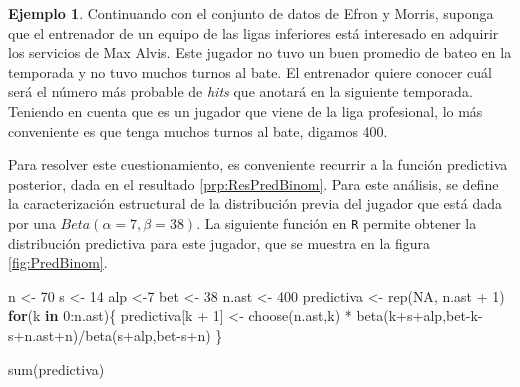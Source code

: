 \documentclass[
  spanish,
]{book}
\newenvironment{Shaded}{\begin{snugshade}}{\end{snugshade}}
\newcommand{\ConstantTok}[1]{\textcolor[rgb]{0.00,0.00,0.00}{#1}}
\newcommand{\ControlFlowTok}[1]{\textcolor[rgb]{0.13,0.29,0.53}{\textbf{#1}}}
\newcommand{\DecValTok}[1]{\textcolor[rgb]{0.00,0.00,0.81}{#1}}
\newcommand{\FunctionTok}[1]{\textcolor[rgb]{0.00,0.00,0.00}{#1}}
\newcommand{\NormalTok}[1]{#1}
\newcommand{\OtherTok}[1]{\textcolor[rgb]{0.56,0.35,0.01}{#1}}
\newcommand{\SpecialCharTok}[1]{\textcolor[rgb]{0.00,0.00,0.00}{#1}}
\theoremstyle{definition}
\theoremstyle{definition}
\newtheorem{example}{Ejemplo}[chapter]
\theoremstyle{definition}
\theoremstyle{definition}
\theoremstyle{remark}
\begin{document}
\begin{example}
\protect\hypertarget{exm:unnamed-chunk-29}{}{\label{exm:unnamed-chunk-29} }Continuando con el conjunto de datos de Efron y Morris, suponga que el entrenador de un equipo de las ligas inferiores está interesado en adquirir los servicios de Max Alvis. Este jugador no tuvo un buen promedio de bateo en la temporada y no tuvo muchos turnos al bate. El entrenador quiere conocer cuál será el número más probable de \emph{hits} que anotará en la siguiente temporada. Teniendo en cuenta que es un jugador que viene de la liga profesional, lo más conveniente es que tenga muchos turnos al bate, digamos 400.

Para resolver este cuestionamiento, es conveniente recurrir a la función predictiva posterior, dada en el resultado \ref{prp:ResPredBinom}. Para este análisis, se define la caracterización estructural de la distribución previa del jugador que está dada por una \(Beta(\alpha=7, \beta=38)\). La siguiente función en \texttt{R} permite obtener la distribución predictiva para este jugador, que se muestra en la figura \ref{fig:PredBinom}.
\end{example}

\begin{Shaded}
\begin{Highlighting}[]
\NormalTok{n }\OtherTok{\textless{}{-}} \DecValTok{70}
\NormalTok{s }\OtherTok{\textless{}{-}} \DecValTok{14}
\NormalTok{alp }\OtherTok{\textless{}{-}}\DecValTok{7}
\NormalTok{bet }\OtherTok{\textless{}{-}} \DecValTok{38}
\NormalTok{n.ast }\OtherTok{\textless{}{-}} \DecValTok{400}
\NormalTok{predictiva }\OtherTok{\textless{}{-}} \FunctionTok{rep}\NormalTok{(}\ConstantTok{NA}\NormalTok{, n.ast }\SpecialCharTok{+} \DecValTok{1}\NormalTok{)}
\ControlFlowTok{for}\NormalTok{(k }\ControlFlowTok{in} \DecValTok{0}\SpecialCharTok{:}\NormalTok{n.ast)\{}
\NormalTok{  predictiva[k }\SpecialCharTok{+} \DecValTok{1}\NormalTok{] }\OtherTok{\textless{}{-}}
  \FunctionTok{choose}\NormalTok{(n.ast,k) }\SpecialCharTok{*}
    \FunctionTok{beta}\NormalTok{(k}\SpecialCharTok{+}\NormalTok{s}\SpecialCharTok{+}\NormalTok{alp,bet}\SpecialCharTok{{-}}\NormalTok{k}\SpecialCharTok{{-}}\NormalTok{s}\SpecialCharTok{+}\NormalTok{n.ast}\SpecialCharTok{+}\NormalTok{n)}\SpecialCharTok{/}\FunctionTok{beta}\NormalTok{(s}\SpecialCharTok{+}\NormalTok{alp,bet}\SpecialCharTok{{-}}\NormalTok{s}\SpecialCharTok{+}\NormalTok{n)}
\NormalTok{\}}

\FunctionTok{sum}\NormalTok{(predictiva)}
\end{Highlighting}
\end{Shaded}
\end{document}
